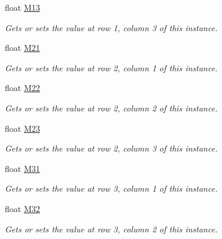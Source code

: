 \begin{DoxyCompactItemize}
float \hyperlink{struct_open_t_k_1_1_matrix4x3_aaa90dc331cfc17a832be7f671cda573f}{M13}
\begin{DoxyCompactList}\small\item\em Gets or sets the value at row 1, column 3 of this instance. \end{DoxyCompactList}\item 
float \hyperlink{struct_open_t_k_1_1_matrix4x3_aec42267f4cc6a67ca7d20bd991b063f0}{M21}
\begin{DoxyCompactList}\small\item\em Gets or sets the value at row 2, column 1 of this instance. \end{DoxyCompactList}\item 
float \hyperlink{struct_open_t_k_1_1_matrix4x3_a2fdbd4d53dd67560abd2b03e62fbd56c}{M22}
\begin{DoxyCompactList}\small\item\em Gets or sets the value at row 2, column 2 of this instance. \end{DoxyCompactList}\item 
float \hyperlink{struct_open_t_k_1_1_matrix4x3_a593393dd96138d9a312c6e0ac197bd10}{M23}
\begin{DoxyCompactList}\small\item\em Gets or sets the value at row 2, column 3 of this instance. \end{DoxyCompactList}\item 
float \hyperlink{struct_open_t_k_1_1_matrix4x3_afe9d19f5cb53a6db44d794f4643c7643}{M31}
\begin{DoxyCompactList}\small\item\em Gets or sets the value at row 3, column 1 of this instance. \end{DoxyCompactList}\item 
float \hyperlink{struct_open_t_k_1_1_matrix4x3_ab765c24562ac0b0455a1e8e4d44b8907}{M32}
\begin{DoxyCompactList}\small\item\em Gets or sets the value at row 3, column 2 of this instance. \end{DoxyCompactList}\item 

\end{DoxyCompactItemize}
